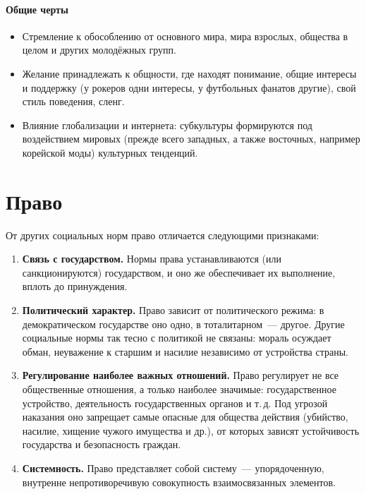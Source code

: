 \documentclass[12pt]{article}
\begin{document}
	\paragraph{Общие черты}
	\begin{itemize}
		\item Стремление к обособлению от основного мира, мира взрослых, общества в целом и других молодёжных групп.
		\item Желание принадлежать к общности, где находят понимание, общие интересы и поддержку (у рокеров одни интересы, у футбольных фанатов другие), свой стиль поведения, сленг.
		\item Влияние глобализации и интернета: субкультуры формируются под воздействием мировых (прежде всего западных, а также восточных, например корейской моды) культурных тенденций.
	\end{itemize}

	\section{Право}
	
	\begin{note}
		От других социальных норм право отличается следующими признаками:
		\begin{enumerate}
			\item \textbf{Связь с государством.} Нормы права устанавливаются (или санкционируются) государством, и оно же обеспечивает их выполнение, вплоть до принуждения.
			\item \textbf{Политический характер.} Право зависит от политического режима: в демократическом государстве оно одно, в тоталитарном~--- другое. Другие социальные нормы так тесно с политикой не связаны: мораль осуждает обман, неуважение к старшим и насилие независимо от устройства страны.
			\item \textbf{Регулирование наиболее важных отношений.} Право регулирует не все общественные отношения, а только наиболее значимые: государственное устройство, деятельность государственных органов и т.\,д. Под угрозой наказания оно запрещает самые опасные для общества действия (убийство, насилие, хищение чужого имущества и др.), от которых зависят устойчивость государства и безопасность граждан.
			\item \textbf{Системность.} Право представляет собой систему~--- упорядоченную, внутренне непротиворечивую совокупность взаимосвязанных элементов.
		\end{enumerate}
	\end{note}
	
\end{document}
